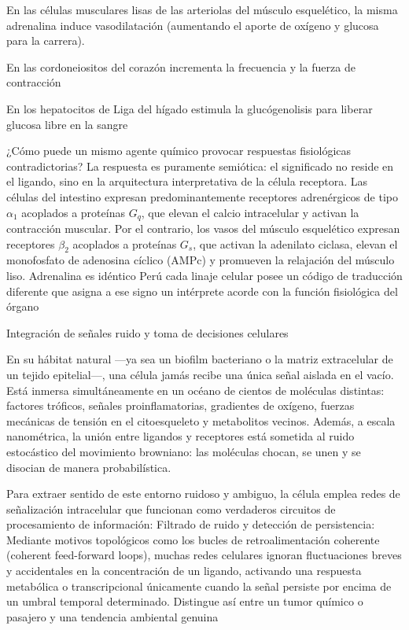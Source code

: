 En las células musculares lisas de las arteriolas del músculo esquelético, la misma adrenalina induce vasodilatación (aumentando el aporte de oxígeno y glucosa para la carrera).

En las cordoneiositos del corazón incrementa la frecuencia y la fuerza de contracción

En los hepatocitos de Liga del hígado estimula la glucógenolisis para liberar glucosa libre en la sangre 

¿Cómo puede un mismo agente químico provocar respuestas fisiológicas contradictorias? La respuesta es puramente semiótica: el significado no reside en el ligando, sino en la arquitectura interpretativa de la célula receptora.
Las células del intestino expresan predominantemente receptores adrenérgicos de tipo $\alpha_1$ acoplados a proteínas $G_q$, que elevan el calcio intracelular y activan la contracción muscular. Por el contrario, los vasos del músculo esquelético expresan receptores $\beta_2$ acoplados a proteínas $G_s$, que activan la adenilato ciclasa, elevan el monofosfato de adenosina cíclico (AMPc) y promueven la relajación del músculo liso. 
Adrenalina es idéntico Perú cada linaje celular posee un código de traducción diferente que asigna a ese signo un intérprete acorde con la función fisiológica del órgano

Integración de señales ruido y toma de decisiones celulares 

En su hábitat natural —ya sea un biofilm bacteriano o la matriz extracelular de un tejido epitelial—, una célula jamás recibe una única señal aislada en el vacío. 
Está inmersa simultáneamente en un océano de cientos de moléculas distintas: factores tróficos, señales proinflamatorias, gradientes de oxígeno, fuerzas mecánicas de tensión en el citoesqueleto y metabolitos vecinos.
Además, a escala nanométrica, la unión entre ligandos y receptores está sometida al ruido estocástico del movimiento browniano: las moléculas chocan, se unen y se disocian de manera probabilística.

Para extraer sentido de este entorno ruidoso y ambiguo, la célula emplea redes de señalización intracelular que funcionan como verdaderos circuitos de procesamiento de información:
Filtrado de ruido y detección de persistencia: Mediante motivos topológicos como los bucles de retroalimentación coherente (coherent feed-forward loops), muchas redes celulares ignoran fluctuaciones breves y accidentales en la concentración de un ligando, activando una respuesta metabólica o transcripcional únicamente cuando la señal persiste por encima de un umbral temporal determinado. 
Distingue así entre un tumor químico o pasajero y una tendencia ambiental genuina

